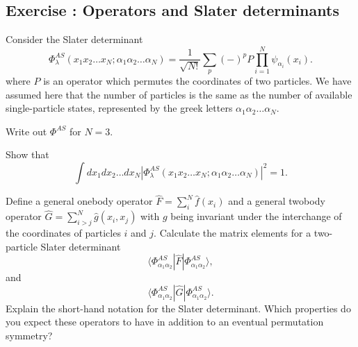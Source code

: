 \documentclass[graybox,sectrefs,envcountresetchap,open=right]{svmonodo}
\newenvironment{doconceexercise}{}{}
\newcounter{doconceexercisecounter}
\begin{document}
\begin{doconceexercise}

\subsection*{Exercise \thedoconceexercisecounter: Operators and Slater determinants}


Consider the Slater determinant
\[
\Phi_{\lambda}^{AS}(x_{1}x_{2}\dots x_{N};\alpha_{1}\alpha_{2}\dots\alpha_{N})
=\frac{1}{\sqrt{N!}}\sum_{p}(-)^{p}P\prod_{i=1}^{N}\psi_{\alpha_{i}}(x_{i}).
\]
where $P$ is an operator which permutes the coordinates of two particles. We have assumed here that the 
number of particles is the same as the number of available single-particle states, represented by the
greek letters $\alpha_{1}\alpha_{2}\dots\alpha_{N}$.


Write  out $\Phi^{AS}$ for $N=3$.

Show that
\[
\int dx_{1}dx_{2}\dots dx_{N}\left\vert
\Phi_{\lambda}^{AS}(x_{1}x_{2}\dots x_{N};\alpha_{1}\alpha_{2}\dots\alpha_{N})
\right\vert^{2} = 1.
\]

Define a general onebody operator $\hat{F} = \sum_{i}^N\hat{f}(x_{i})$ and a general  twobody operator $\hat{G}=\sum_{i>j}^N\hat{g}(x_{i},x_{j})$ with $g$ being invariant under the interchange of the coordinates of particles $i$ and $j$. Calculate the matrix elements for a two-particle Slater determinant
\[
\langle\Phi_{\alpha_{1}\alpha_{2}}^{AS}|\hat{F}|\Phi_{\alpha_{1}\alpha_{2}}^{AS}\rangle,
\]
and
\[
\langle\Phi_{\alpha_{1}\alpha_{2}}^{AS}|\hat{G}|\Phi_{\alpha_{1}\alpha_{2}}^{AS}\rangle.
\]
Explain the short-hand notation for the Slater determinant.
Which properties do you expect these operators to have in addition to an eventual permutation
symmetry?


\end{doconceexercise}
\end{document}
